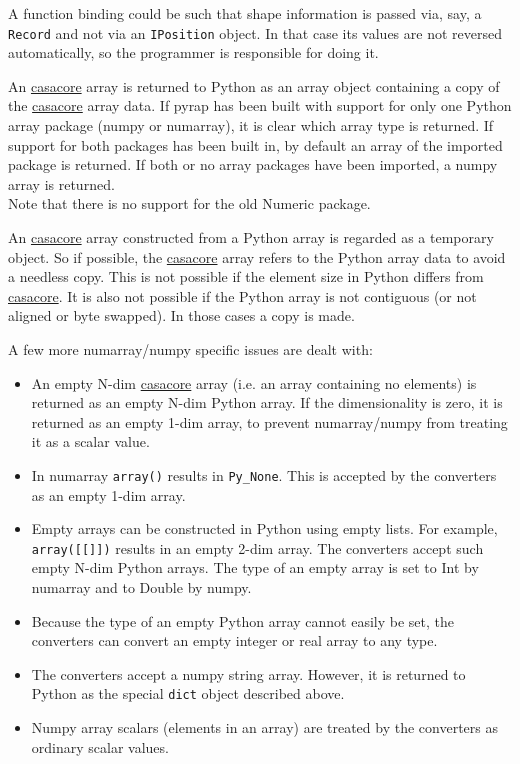 A function binding could be such that shape information is passed via, say, a
\texttt{Record} and not via an \texttt{IPosition} object.
In that case its values
are not reversed automatically, so the programmer is
responsible for doing it.

An \href{http://casacore.googlecode.com}{casacore} array is returned to Python as an array object
containing a copy of the \href{http://casacore.googlecode.com}{casacore} array data. If pyrap has
been built with support for only one Python array package (numpy or numarray),
it is clear which array type is returned. If support for both
packages has been built in, by default an array of the imported
package is returned. If both or no array packages have been imported, a numpy
array is returned.
\\Note that there is no support for the old Numeric package.

An \href{http://casacore.googlecode.com}{casacore} array constructed from a Python array is regarded as a
temporary object. So if possible, the \href{http://casacore.googlecode.com}{casacore} array refers to the
Python array data to avoid a needless copy. This is not possible if
the element size in Python differs from \href{http://casacore.googlecode.com}{casacore}. It is also not
possible if the Python array is not contiguous (or not aligned or
byte swapped). In those cases a copy is made.

A few more numarray/numpy specific issues are dealt with:
\begin{itemize}
\item An empty N-dim \href{http://casacore.googlecode.com}{casacore} array (i.e. an array containing no elements) is
returned as an empty N-dim Python array. If the dimensionality is
zero, it is returned as an empty 1-dim array, to prevent numarray/numpy
from treating it as a scalar value.
\item In numarray \texttt{array()} results in \texttt{Py\_None}. This
is accepted by the converters as an empty 1-dim array.
\item Empty arrays can be constructed in Python using empty lists. For
example, \texttt{array([[]])} results in an empty 2-dim array. The
converters accept such empty N-dim Python arrays. The type of an empty
array is set to Int by numarray and to Double by numpy.
\item Because the type of an empty Python array cannot easily be set,
the converters can convert an empty integer or real array to any type.
\item The converters accept a numpy string array. However, it is
returned to Python as the special \texttt{dict} object described
above.
\item Numpy array scalars (elements in an array) are treated by the
converters as ordinary scalar values.
\end{itemize}

